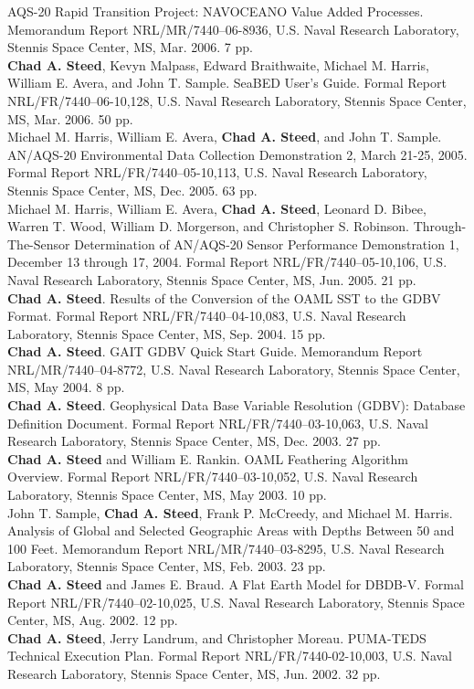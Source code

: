 \documentclass[11pt, a4paper]{article}
\newcommand{\years}[1]{\marginnote{\scriptsize #1}}
\begin{document}
\begin{sloppypar}
AQS-20 Rapid Transition Project: NAVOCEANO Value Added Processes. Memorandum
Report NRL/MR/7440–06-8936, U.S. Naval Research Laboratory, Stennis Space
Center, MS, Mar. 2006. 7 pp.\\
\years{2006}\textbf{Chad A. Steed}, Kevyn Malpass, Edward Braithwaite,
Michael M. Harris, William E. Avera, and John T. Sample. SeaBED User’s Guide.
Formal Report NRL/FR/7440–06-10,128, U.S. Naval Research Laboratory, Stennis
Space Center, MS, Mar. 2006. 50 pp.\\
\years{2005}Michael M. Harris, William E. Avera, \textbf{Chad A. Steed}, and
John T. Sample. AN/AQS-20 Environmental Data Collection Demonstration 2,
March 21-25, 2005. Formal Report NRL/FR/7440–05-10,113, U.S. Naval Research
Laboratory, Stennis Space Center, MS, Dec. 2005. 63 pp.\\
\years{2005}Michael M. Harris, William E. Avera, \textbf{Chad A. Steed},
Leonard D. Bibee, Warren T. Wood, William D. Morgerson, and Christopher S.
Robinson. Through-The-Sensor Determination of AN/AQS-20 Sensor Performance
Demonstration 1, December 13 through 17, 2004. Formal Report
NRL/FR/7440–05-10,106, U.S. Naval Research Laboratory, Stennis Space
Center, MS, Jun. 2005. 21 pp.\\
\years{2004}\textbf{Chad A. Steed}. Results of the Conversion of the OAML SST
to the GDBV Format. Formal Report NRL/FR/7440–04-10,083, U.S. Naval Research
Laboratory, Stennis Space Center, MS, Sep. 2004. 15 pp.\\
\years{2004}\textbf{Chad A. Steed}. GAIT GDBV Quick Start Guide. Memorandum
Report NRL/MR/7440–04-8772, U.S. Naval Research Laboratory, Stennis Space
Center, MS, May 2004. 8 pp.\\
\years{2003}\textbf{Chad A. Steed}. Geophysical Data Base Variable Resolution
(GDBV): Database Definition Document. Formal Report NRL/FR/7440–03-10,063,
U.S. Naval Research Laboratory, Stennis Space Center, MS, Dec. 2003. 27 pp.\\
\years{2003}\textbf{Chad A. Steed} and William E. Rankin. OAML Feathering
Algorithm Overview. Formal Report NRL/FR/7440–03-10,052, U.S. Naval
Research Laboratory, Stennis Space Center, MS, May 2003. 10 pp.\\
\years{2003}John T. Sample, \textbf{Chad A. Steed}, Frank P. McCreedy, and
Michael M. Harris. Analysis of Global and Selected Geographic Areas with
Depths Between 50 and 100 Feet. Memorandum Report NRL/MR/7440–03-8295, U.S.
Naval Research Laboratory, Stennis Space Center, MS, Feb. 2003. 23 pp.\\
\years{2002}\textbf{Chad A. Steed} and James E. Braud. A Flat Earth Model for
DBDB-V. Formal Report NRL/FR/7440–02-10,025, U.S. Naval Research Laboratory,
Stennis Space Center, MS, Aug. 2002. 12 pp.\\
\years{2002}\textbf{Chad A. Steed}, Jerry Landrum, and Christopher Moreau.
PUMA-TEDS Technical Execution Plan. Formal Report NRL/FR/7440-02-10,003, U.S.
Naval Research Laboratory, Stennis Space Center, MS, Jun. 2002. 32 pp.
\end{sloppypar}
\end{document}
